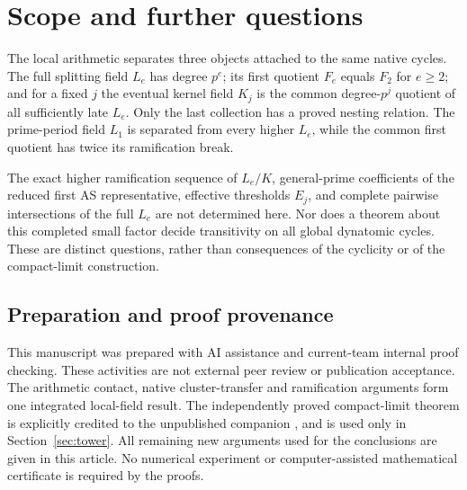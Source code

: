 \section{Scope and further questions}

The local arithmetic separates three objects attached to
the same native cycles. The full splitting field \(L_e\)
has degree \(p^e\); its first quotient \(F_e\) equals
\(F_2\) for \(e\ge2\); and for a fixed \(j\) the eventual
kernel field \(K_j\) is the common degree-\(p^j\) quotient
of all sufficiently late \(L_e\).
Only the last collection has a proved nesting relation.
The prime-period field \(L_1\) is separated from every
higher \(L_e\), while the common first quotient has twice
its ramification break.

The exact higher ramification sequence of \(L_e/K\),
general-prime coefficients of the reduced first AS
representative, effective thresholds \(E_j\), and complete
pairwise intersections of the full \(L_e\) are not
determined here. Nor does a theorem about this completed
small factor decide transitivity on all global dynatomic
cycles. These are distinct questions, rather than
consequences of the cyclicity or of the compact-limit
construction.

\subsection*{Preparation and proof provenance}

This manuscript was prepared with AI assistance and
current-team internal proof checking. These activities
are not external peer review or publication acceptance.
The arithmetic contact, native cluster-transfer and
ramification arguments form one integrated local-field
result. The independently proved compact-limit theorem
is explicitly credited to the unpublished companion
\cite{companion2026haar}, and is used only in
Section~\ref{sec:tower}. All remaining new arguments used
for the conclusions are given in this article.
No numerical experiment or computer-assisted mathematical
certificate is required by the proofs.
